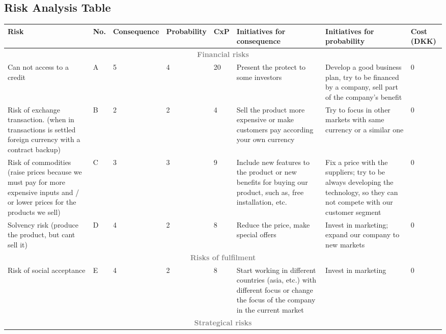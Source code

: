 \begin{landscape}
\section{Risk Analysis Table}
\label{riskapp}
\def\arraystretch{1.5}
\begin{table}[h!]
\centering
\scriptsize
\begin{tabular}[0.8\textswidth]{|p{5cm} |p{1cm} |p{2cm} |p{2cm} |p{1cm} |p{2.8cm} |p{2.8cm} |p{2cm}|}
\hline
Risk 										&No.& Consequence	& Probability	& CxP	& Initiatives \newline for consequence	& Initiatives \newline for probability	& 	Cost (DKK) \\
\hline
\multicolumn{8}{|c|}{\normalsize{\textcolor{gray}{\textbf{Financial risks}}}}\\
\hline
Can not access to a credit					& A	& 5				&	4			& 20	& Present the protect to some investors	& Develop a good business plan, try to be financed by a company, sell part of the company's benefit	& 0\\
\hline
Risk of exchange transaction. 
(when in transactions is settled 
foreign currency with a contract backup)	& B	& 2				& 2				&  4	& Sell the product more expensive or make customers pay according your own currency
 &	Try to focus in other markets with same currency or a similar one &  0\\
\hline
Risk of commodities (raise prices because 
we  must pay for more expensive  inputs and
 / or lower prices for the products we sell)& C	& 3				& 3				& 9		& Include new features to the product or new benefits for buying our product, such as, free installation, etc.
 & Fix a price with the suppliers; try to be always developing the technology, so they can not compete with our customer segment & 0 \\
\hline
Solvency risk (produce the product, but cant sell it)	& D	& 4				& 2				& 8		& Reduce the price, make special offers & Invest in marketing; expand our company to new markets & 0 \\
\hline
\multicolumn{8}{|c|}{\normalsize{\textcolor{gray}{\textbf{Risks of fulfilment}}}}\\
\hline
Risk of social acceptance & E & 4 &  2 & 8 & Start working in different countries (asia, etc.) with different focus or change the focus of the company in the current market
& Invest in marketing &0 \\
\hline
\multicolumn{8}{|c|}{\normalsize{\textcolor{gray}{\textbf{Strategical risks}}}}\\

\end{tabular}
\end{table}
\end{landscape}
